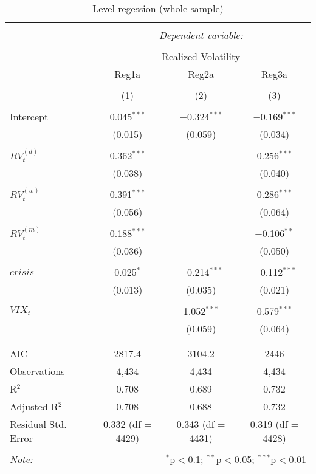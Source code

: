 
\begin{table}[!htbp] \centering 
  \caption{Level regession (whole sample)} 
  \label{tab:newey1} 
\begin{tabular}{@{\extracolsep{5pt}}lccc} 
\\[-1.8ex]\hline 
\hline \\[-1.8ex] 
 & \multicolumn{3}{c}{\textit{Dependent variable:}} \\ 
\cline{2-4} 
\\[-1.8ex] & \multicolumn{3}{c}{Realized Volatility} \\ 
 & Reg1a & Reg2a & Reg3a \\ 
\\[-1.8ex] & (1) & (2) & (3)\\ 
\hline \\[-1.8ex] 
 Intercept & 0.045$^{***}$ & $-$0.324$^{***}$ & $-$0.169$^{***}$ \\ 
  & (0.015) & (0.059) & (0.034) \\ 
  & & & \\ 
 $RV^{(d)}_{t}$ & 0.362$^{***}$ &  & 0.256$^{***}$ \\ 
  & (0.038) &  & (0.040) \\ 
  & & & \\ 
 $RV^{(w)}_{t}$ & 0.391$^{***}$ &  & 0.286$^{***}$ \\ 
  & (0.056) &  & (0.064) \\ 
  & & & \\ 
 $RV^{(m)}_{t}$ & 0.188$^{***}$ &  & $-$0.106$^{**}$ \\ 
  & (0.036) &  & (0.050) \\ 
  & & & \\ 
 $crisis$ & 0.025$^{*}$ & $-$0.214$^{***}$ & $-$0.112$^{***}$ \\ 
  & (0.013) & (0.035) & (0.021) \\ 
  & & & \\ 
 $VIX_{t}$ &  & 1.052$^{***}$ & 0.579$^{***}$ \\ 
  &  & (0.059) & (0.064) \\ 
  & & & \\ 
\hline \\[-1.8ex] 
AIC & 2817.4 & 3104.2 & 2446 \\ 
Observations & 4,434 & 4,434 & 4,434 \\ 
R$^{2}$ & 0.708 & 0.689 & 0.732 \\ 
Adjusted R$^{2}$ & 0.708 & 0.688 & 0.732 \\ 
Residual Std. Error & 0.332 (df = 4429) & 0.343 (df = 4431) & 0.319 (df = 4428) \\ 
\hline 
\hline \\[-1.8ex] 
\textit{Note:}  & \multicolumn{3}{r}{$^{*}$p$<$0.1; $^{**}$p$<$0.05; $^{***}$p$<$0.01} \\ 
\end{tabular} 
\end{table} 
